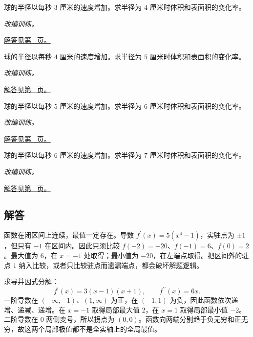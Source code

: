 \documentclass[12pt,fontset=fandol]{ctexart}
\begin{document}
\begin{example}[相关变化率中的链式法则]\label{ex:c11q22}
球的半径以每秒 $3$ 厘米的速度增加。求半径为 $4$ 厘米时体积和表面积的变化率。
\par\textit{改编训练。}\par\hyperref[ans:c11q22]{解答见第~\pageref{ans:c11q22} 页。}
\end{example}
\begin{example}[相关变化率中的链式法则]\label{ex:c11q23}
球的半径以每秒 $4$ 厘米的速度增加。求半径为 $5$ 厘米时体积和表面积的变化率。
\par\textit{改编训练。}\par\hyperref[ans:c11q23]{解答见第~\pageref{ans:c11q23} 页。}
\end{example}
\begin{example}[相关变化率中的链式法则]\label{ex:c11q24}
球的半径以每秒 $5$ 厘米的速度增加。求半径为 $6$ 厘米时体积和表面积的变化率。
\par\textit{改编训练。}\par\hyperref[ans:c11q24]{解答见第~\pageref{ans:c11q24} 页。}
\end{example}
\begin{example}[相关变化率中的链式法则]\label{ex:c11q25}
球的半径以每秒 $6$ 厘米的速度增加。求半径为 $7$ 厘米时体积和表面积的变化率。
\par\textit{改编训练。}\par\hyperref[ans:c11q25]{解答见第~\pageref{ans:c11q25} 页。}
\end{example}
\subsection{解答}
\begin{solve}\label{ans:c11q1}
函数在闭区间上连续，最值一定存在。导数 $f^{\prime}(x)=5(x^4-1)$，实驻点为 $\pm1$，但只有 $-1$ 在区间内。因此只须比较 $f(-2)=-20$、$f(-1)=6$、$f(0)=2$。最大值为 $6$，在 $x=-1$ 处取得；最小值为 $-20$，在左端点取得。把区间外的驻点 $1$ 纳入比较，或者只比较驻点而遗漏端点，都会破坏解题逻辑。
\end{solve}

\begin{solve}\label{ans:c11q2}
求导并因式分解：
\[
f^{\prime}(x)=3(x-1)(x+1),\qquad f^{\prime\prime}(x)=6x.
\]
一阶导数在 $(-\infty,-1)$、$(1,\infty)$ 为正，在 $(-1,1)$ 为负，因此函数依次递增、递减、递增。在 $x=-1$ 取得局部最大值 $2$，在 $x=1$ 取得局部最小值 $-2$。二阶导数在 $0$ 两侧变号，所以拐点为 $(0,0)$。函数向两端分别趋于负无穷和正无穷，故这两个局部极值都不是全实轴上的全局最值。
\end{solve}
\end{document}
